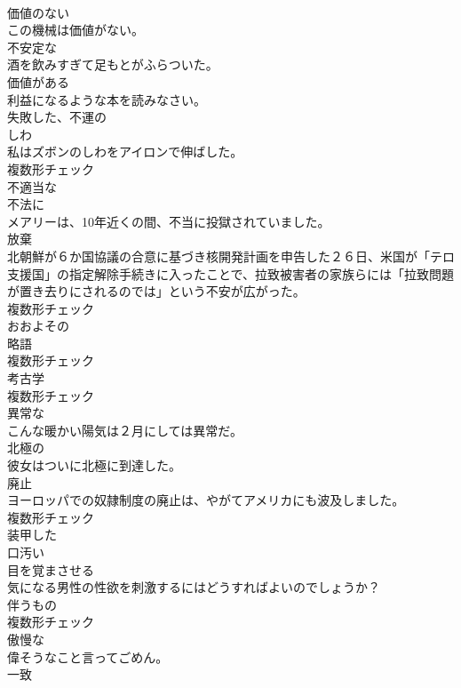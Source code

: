 \documentclass[8pt]{extreport}
\begin{document}
\begin{CJK}{UTF8}{min}
\\	[形容詞]	価値のない	
\\	この機械は価値がない。	
\\	[形容詞]	不安定な	
\\	酒を飲みすぎて足もとがふらついた。	
\\	[形容詞]	価値がある	
\\	利益になるような本を読みなさい。	
\\	[形容詞]	失敗した、不運の	
\\	[名詞]	しわ	
\\	私はズボンのしわをアイロンで伸ばした。	
\\	複数形チェック
\\	[形容詞]	不適当な	
\\	[副詞]	不法に	
\\	メアリーは、10年近くの間、不当に投獄されていました。	
\\	[名詞]	放棄	
\\	北朝鮮が６か国協議の合意に基づき核開発計画を申告した２６日、米国が「テロ支援国」の指定解除手続きに入ったことで、拉致被害者の家族らには「拉致問題が置き去りにされるのでは」という不安が広がった。	
\\	複数形チェック
\\	[形容詞]	おおよその	
\\	[名詞]	略語	
\\	複数形チェック
\\	[名詞]	考古学	
\\	複数形チェック
\\	[形容詞]	異常な	
\\	こんな暖かい陽気は２月にしては異常だ。	
\\	[形容詞]	北極の	
\\	彼女はついに北極に到達した。	
\\	[名詞]	廃止	
\\	ヨーロッパでの奴隷制度の廃止は、やがてアメリカにも波及しました。	
\\	複数形チェック
\\	[形容詞]	装甲した	
\\	[形容詞]	口汚い	
\\	[動詞]	目を覚まさせる	
\\	気になる男性の性欲を刺激するにはどうすればよいのでしょうか？	
\\	[名詞]	伴うもの	
\\	複数形チェック
\\	[形容詞]	傲慢な	
\\	偉そうなこと言ってごめん。	
\\	[名詞]	一致	

\end{CJK}
\end{document}
